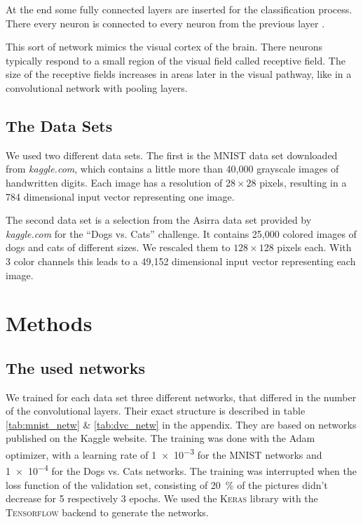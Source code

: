 \documentclass[%
 reprint,
 amsmath,amssymb,
 aps,
]{revtex4-1}
\begin{document}
At the end some fully connected layers are inserted for the classification process. There every neuron is connected to every neuron from the previous layer \cite{Goodfellow-et-al-2016}.

This sort of network mimics the visual cortex of the brain. There neurons typically respond to a small region of the visual field called receptive field. The size of the receptive fields increases in areas later in the visual pathway, like in a convolutional network with pooling layers.

\subsection{The Data Sets}

We used two different data sets. The first is the MNIST data set downloaded from \emph{kaggle.com}, which contains a little more than 40,000 grayscale images of handwritten digits. Each image has a resolution of $28\times 28$ pixels, resulting in a 784 dimensional input vector representing one image. 

The second data set is a selection from the Asirra data set provided by \emph{kaggle.com} for the ``Dogs vs. Cats'' challenge. It contains 25,000 colored images of dogs and cats of different sizes. We rescaled them to $128\times 128$ pixels each. With 3 color channels this leads to a 49,152 dimensional input vector representing each image. 
\section{Methods}

\subsection{The used networks}

We trained for each data set three different networks, that differed in the number of the convolutional layers. Their exact structure is described in table \ref{tab:mnist_netw} \& \ref{tab:dvc_netw} in the appendix. They are based on networks published on the Kaggle website. The training was done with the Adam optimizer, with a learning rate of \SI{1e-3}{} for the MNIST networks and \SI{1e-4}{} for the Dogs vs. Cats networks. The training was interrupted when the loss function of the validation set, consisting of \SI{20}{\percent} of the pictures didn't decrease for 5 respectively 3 epochs. 
We used the \textsc{Keras} library with the \textsc{Tensorflow} backend to generate the networks.
\end{document}
